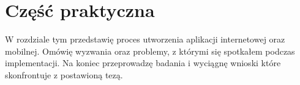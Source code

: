 \chapter{Część praktyczna}
W rozdziale tym przedstawię proces utworzenia aplikacji internetowej oraz mobilnej. Omówię wyzwania oraz problemy, z którymi się spotkałem podczas implementacji. Na koniec przeprowadzę badania i wyciągnę wnioski które skonfrontuje z postawioną tezą.
